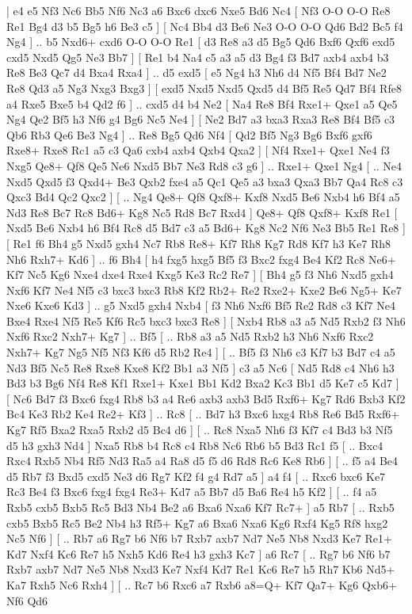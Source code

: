 \makegametitle 
|   e4   e5    Nf3   Nc6    Bb5   Nf6    Nc3   a6    Bxc6   dxc6    Nxe5   Bd6    Nc4 [  Nf3 O-O  O-O Re8  Re1 Bg4  d3 b5  Bg5 h6  Be3 c5   ]  [  Nc4 Bb4  d3 Be6  Ne3 O-O  O-O Qd6  Bd2 Bc5  f4 Ng4   ] .. b5    Nxd6+   cxd6    O-O   O-O    Re1 [  d3 Re8  a3 d5  Bg5 Qd6  Bxf6 Qxf6  exd5 cxd5  Nxd5 Qg5  Ne3 Bb7   ]  [  Re1 b4  Na4 c5  a3 a5  d3 Bg4  f3 Bd7  axb4 axb4  b3 Re8  Be3 Qc7  d4 Bxa4  Rxa4   ] .. d5    exd5 [  e5 Ng4  h3 Nh6  d4 Nf5  Bf4 Bd7  Ne2 Re8  Qd3 a5  Ng3 Nxg3  Bxg3   ]  [  exd5 Nxd5  Nxd5 Qxd5  d4 Bf5  Re5 Qd7  Bf4 Rfe8  a4 Rxe5  Bxe5 b4  Qd2 f6   ] .. cxd5    d4   b4    Ne2 [  Na4 Re8  Bf4 Rxe1+  Qxe1 a5  Qe5 Ng4  Qe2 Bf5  h3 Nf6  g4 Bg6  Nc5 Ne4   ]  [  Ne2 Bd7  a3 bxa3  Rxa3 Re8  Bf4 Bf5  c3 Qb6  Rb3 Qe6  Be3 Ng4   ] .. Re8    Bg5   Qd6    Nf4 [  Qd2 Bf5  Ng3 Bg6  Bxf6 gxf6  Rxe8+ Rxe8  Rc1 a5  c3 Qa6  cxb4 axb4  Qxb4 Qxa2   ]  [  Nf4 Rxe1+  Qxe1 Ne4  f3 Nxg5  Qe8+ Qf8  Qe5 Ne6  Nxd5 Bb7  Ne3 Rd8  c3 g6   ] .. Rxe1+    Qxe1  Ng4 [ .. Ne4  Nxd5 Qxd5  f3 Qxd4+  Be3 Qxb2  fxe4 a5  Qc1 Qe5  a3 bxa3  Qxa3 Bb7  Qa4 Rc8  c3 Qxc3  Bd4 Qc2  Qxc2   ]  [ .. Ng4  Qe8+ Qf8  Qxf8+ Kxf8  Nxd5 Be6  Nxb4 h6  Bf4 a5  Nd3 Re8  Bc7 Rc8  Bd6+ Kg8  Nc5 Rd8  Bc7 Rxd4   ]  Qe8+   Qf8   Qxf8+   Kxf8   Re1 [  Nxd5 Be6  Nxb4 h6  Bf4 Rc8  d5 Bd7  c3 a5  Bd6+ Kg8  Nc2 Nf6  Ne3 Bb5  Re1 Re8   ]  [  Re1 f6  Bh4 g5  Nxd5 gxh4  Nc7 Rb8  Re8+ Kf7  Rh8 Kg7  Rd8 Kf7  h3 Ke7  Rh8 Nh6  Rxh7+ Kd6   ] .. f6    Bh4 [  h4 fxg5  hxg5 Bf5  f3 Bxc2  fxg4 Be4  Kf2 Rc8  Ne6+ Kf7  Nc5 Kg6  Nxe4 dxe4  Rxe4 Kxg5  Ke3 Rc2  Re7   ]  [  Bh4 g5  f3 Nh6  Nxd5 gxh4  Nxf6 Kf7  Ne4 Nf5  c3 bxc3  bxc3 Rb8  Kf2 Rb2+  Re2 Rxe2+  Kxe2 Be6  Ng5+ Ke7  Nxe6 Kxe6  Kd3   ] .. g5    Nxd5   gxh4    Nxb4 [  f3 Nh6  Nxf6 Bf5  Re2 Rd8  c3 Kf7  Ne4 Bxe4  Rxe4 Nf5  Re5 Kf6  Rc5 bxc3  bxc3 Re8   ]  [  Nxb4 Rb8  a3 a5  Nd5 Rxb2  f3 Nh6  Nxf6 Rxc2  Nxh7+ Kg7   ] .. Bf5 [ .. Rb8  a3 a5  Nd5 Rxb2  h3 Nh6  Nxf6 Rxc2  Nxh7+ Kg7  Ng5 Nf5  Nf3 Kf6  d5 Rb2  Re4   ]  [ .. Bf5  f3 Nh6  c3 Kf7  b3 Bd7  c4 a5  Nd3 Bf5  Nc5 Re8  Rxe8 Kxe8  Kf2 Bb1  a3 Nf5   ]  c3   a5    Nc6 [  Nd5 Rd8  c4 Nh6  h3 Bd3  b3 Bg6  Nf4 Re8  Kf1 Rxe1+  Kxe1 Bb1  Kd2 Bxa2  Kc3 Bb1  d5 Ke7  c5 Kd7   ]  [  Nc6 Bd7  f3 Bxc6  fxg4 Rb8  b3 a4  Re6 axb3  axb3 Bd5  Rxf6+ Kg7  Rd6 Bxb3  Kf2 Bc4  Ke3 Rb2  Ke4 Re2+  Kf3   ] .. Rc8 [ .. Bd7  h3 Bxc6  hxg4 Rb8  Re6 Bd5  Rxf6+ Kg7  Rf5 Bxa2  Rxa5 Rxb2  d5 Bc4  d6   ]  [ .. Rc8  Nxa5 Nh6  f3 Kf7  c4 Bd3  b3 Nf5  d5 h3  gxh3 Nd4   ]  Nxa5   Rb8    b4   Rc8    c4   Rb8    Nc6   Rb6    b5   Bd3    Rc1   f5 [ .. Bxc4  Rxc4 Rxb5  Nb4 Rf5  Nd3 Ra5  a4 Ra8  d5 f5  d6 Rd8  Rc6 Ke8  Rb6   ]  [ .. f5  a4 Be4  d5 Rb7  f3 Bxd5  cxd5 Ne3  d6 Rg7  Kf2 f4  g4 Rd7  a5   ]  a4   f4 [ .. Rxc6  bxc6 Ke7  Rc3 Be4  f3 Bxc6  fxg4 fxg4  Re3+ Kd7  a5 Bb7  d5 Ba6  Re4 h5  Kf2   ]  [ .. f4  a5 Rxb5  cxb5 Bxb5  Rc5 Bd3  Nb4 Be2  a6 Bxa6  Nxa6 Kf7  Rc7+   ]  a5   Rb7 [ .. Rxb5  cxb5 Bxb5  Rc5 Be2  Nb4 h3  Rf5+ Kg7  a6 Bxa6  Nxa6 Kg6  Rxf4 Kg5  Rf8 hxg2  Nc5 Nf6   ]  [ .. Rb7  a6 Rg7  b6 Nf6  b7 Rxb7  axb7 Nd7  Ne5 Nb8  Nxd3 Ke7  Re1+ Kd7  Nxf4 Kc6  Re7 h5  Nxh5 Kd6  Re4 h3  gxh3 Kc7   ]  a6   Rc7 [ .. Rg7  b6 Nf6  b7 Rxb7  axb7 Nd7  Ne5 Nb8  Nxd3 Ke7  Nxf4 Kd7  Re1 Kc6  Re7 h5  Rh7 Kb6  Nd5+ Ka7  Rxh5 Nc6  Rxh4   ]  [ .. Rc7  b6 Rxc6  a7 Rxb6  a8=Q+ Kf7  Qa7+ Kg6  Qxb6+ Nf6  Qd6 